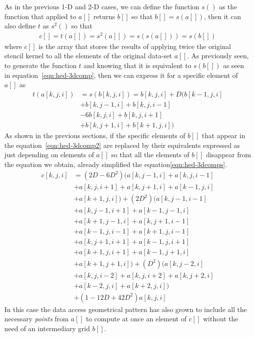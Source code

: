 \documentclass{acm_proc_article-sp}
\begin{document}
As in the previous 1-D and 2-D cases, we can define the function $s()$ as the function that applied to $a[]$ returns $b[]$ so that $b[]=s(a[])$, then it can also define $t$ as $s^2()$ so that
\begin{equation}
  \begin{split}
    c[] = t(a[]) = s^2(a[]) = s(s(a[])) = s(b[])
  \end{split}
  \label{eqn:hed-3dcomp}
\end{equation}
where $c[]$ is the array that stores the results of applying twice the original stencil kernel to all the elements of the original data-set $a[]$. As previously seen, to generate the function $t$ and knowing that it is equivalent to $s(b[])$ as seen in equation~\eqref{eqn:hed-3dcomp}, then we can express it for a specific element of $a[]$ as
\begin{equation}
  \begin{split}
    t(a[k,j,i]) &= s(b[k,j,i]) = b[k,j,i] + D(b[k-1,j,i]\\
    &+ b[k,j-1,i] + b[k,j,i-1]\\
    &- 6b[k,j,i] + b[k,j,i+1]\\
    &+ b[k,j+1,i] + b[k+1,j,i])
  \end{split}
  \label{eqn:hed-3dcomp2}
\end{equation}
As shown in the previous sections, if the specific elements of $b[]$ that appear in the equation~\eqref{eqn:hed-3dcomp2} are replaced by their equivalents expressed as just depending on elements of $a[]$ so that all the elements of $b[]$ disappear from the equation we obtain, already simplified the equation\eqref{eqn:hed-3dcomps}.
\begin{equation}
  \begin{split}
c[k,j,i] &= (2D-6D^2)(a[k,j-1,i] + a[k,j,i-1]\\
&+ a[k,j,i+1] + a[k,j+1,i] + a[k-1,j,i]\\
&+ a[k+1,j,i]) + (2D^2)(a[k,j-1,i-1]\\
&+ a[k,j-1,i+1] + a[k-1,j-1,i]\\
&+ a[k+1,j-1,i] + a[k,j+1,i-1]\\
&+ a[k-1,j,i-1] + a[k+1,j,i-1]\\
&+ a[k,j+1,i+1] + a[k-1,j,i+1]\\
&+ a[k+1,j,i+1] + a[k-1,j+1,i]\\
&+ a[k+1,j+1,i]) + (D^2)(a[k,j-2,i]\\
&+ a[k,j,i-2] + a[k,j,i+2] + a[k,j+2,i]\\
&+ a[k-2,j,i] + a[k+2,j,i])\\
&+ (1-12D+42D^2)a[k,j,i]
  \end{split}
  \label{eqn:hed-3dcomps}
\end{equation}
In this case the data access geometrical pattern has also grown to include all the necessary \textit{points} from $a[]$ to compute at once an element of $c[]$ without the need of an intermediary grid $b[]$.
\end{document}
